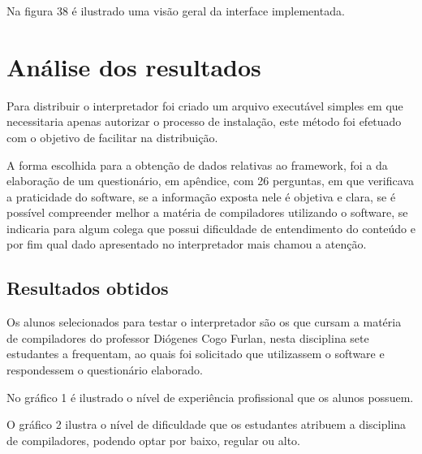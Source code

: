 \documentclass[12pt,oneside,a4paper,chapter=TITLE,section=TITLE,sumario=tradicional]{abntex2}
\begin{document}
Na figura 38 é ilustrado uma visão geral da interface implementada. 

\begin{figure}[htb]
\end{figure}


\chapter{Análise dos resultados}
\label{cap:analiseresultados}

Para distribuir o interpretador foi criado um arquivo executável simples em que necessitaria apenas autorizar o processo de instalação, este método foi efetuado com o objetivo de facilitar na distribuição.

A forma escolhida para a obtenção de dados relativas ao framework, foi a da elaboração de um questionário, em apêndice, com 26 perguntas, em que verificava a praticidade do software, se a informação exposta nele é objetiva e clara, se é possível compreender melhor a matéria de compiladores utilizando o software, se indicaria para algum colega que possui dificuldade de entendimento do conteúdo e por fim qual dado apresentado no interpretador mais chamou a atenção.

\section{Resultados obtidos}
\label{sec:resultados}

Os alunos selecionados para testar o interpretador são os que cursam a matéria de compiladores do professor Diógenes Cogo Furlan, nesta disciplina sete estudantes a frequentam, ao quais foi solicitado que utilizassem o software e respondessem o questionário elaborado.

No gráfico 1 é ilustrado o nível de experiência profissional que os alunos possuem.

\begin{grafico}[H]
\end{grafico}

O gráfico 2 ilustra o nível de dificuldade que os estudantes atribuem a disciplina de compiladores, podendo optar por baixo, regular ou alto.
\end{document}
